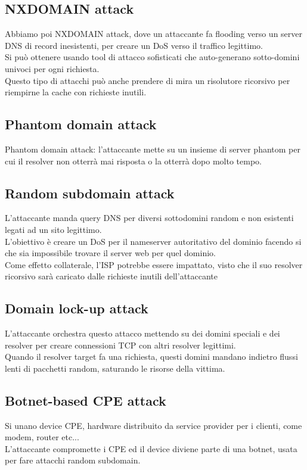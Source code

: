 \documentclass[12pt, oneside]{extbook} %
\begin{document}
\subsection{NXDOMAIN attack}
Abbiamo poi NXDOMAIN attack, dove un attaccante fa flooding verso un server DNS di record inesistenti, per creare un DoS verso il traffico legittimo.
\\Si può ottenere usando tool di attacco sofisticati che auto-generano sotto-domini univoci per ogni richiesta.
\\Questo tipo di attacchi può anche prendere di mira un risolutore ricorsivo per riempirne la cache con richieste inutili.

\subsection{Phantom domain attack}
Phantom domain attack: l'attaccante mette su un insieme di server phantom per cui il resolver non otterrà mai risposta o la otterrà dopo molto tempo.

\subsection{Random subdomain attack}
L'attaccante manda query DNS per diversi sottodomini random e non esistenti legati ad un sito legittimo.
\\L'obiettivo è creare un DoS per il nameserver autoritativo del dominio facendo si che sia impossibile trovare il server web per quel dominio.
\\Come effetto collaterale, l'ISP potrebbe essere impattato, visto che il suo resolver ricorsivo sarà caricato dalle richieste inutili dell'attaccante

\subsection{Domain lock-up attack}
L'attaccante orchestra questo attacco mettendo su dei domini speciali e dei resolver per creare connessioni TCP con altri resolver legittimi.
\\Quando il resolver target fa una richiesta, questi domini mandano indietro flussi lenti di pacchetti random, saturando le risorse della vittima.

\subsection{Botnet-based CPE attack}
Si unano device CPE, hardware distribuito da service provider per i clienti, come modem, router etc...
\\L'attaccante compromette i CPE ed il device diviene parte di una botnet, usata per fare attacchi random subdomain.
\end{document}
